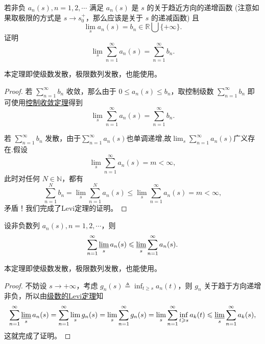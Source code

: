 \documentclass[../../main.tex]{subfiles}
\begin{document}
\begin{theorem}[级数的Levi定理]\label{theorem:级数的Levi定理}
若非负 \( a_n(s), n = 1, 2, \cdots \) 满足 \( a_n(s) \) 是 \( s \) 的关于趋近方向的递增函数 (注意如果取极限的方式是 \( s \to s_0^+ \)，那么应该是关于 \( s \) 的递减函数) 且
\[
\lim_{s} a_n(s) = b_n \in \mathbb{R} \bigcup \{+\infty\}.
\]
证明
\[
\lim_{s} \sum_{n = 1}^{\infty} a_n(s) = \sum_{n = 1}^{\infty} b_n.
\]
\end{theorem}
\begin{note}
本定理即使级数发散，极限数列发散，也能使用。
\end{note}
\begin{proof}
若 \( \sum_{n = 1}^{\infty} b_n \) 收敛，那么由于 \( 0 \leqslant a_n(s) \leqslant b_n \)，取控制级数 \( \sum_{n = 1}^{\infty} b_n \) 即可使用\hyperref[theorem:级数的控制收敛定理]{控制收敛定理}得到
\[
\lim_{s} \sum_{n = 1}^{\infty} a_n(s) = \sum_{n = 1}^{\infty} b_n.
\]

若 \( \sum_{n = 1}^{\infty} b_n \) 发散，由于$\sum_{n = 1}^{\infty} a_n(s)$也单调递增,故$\lim_{s} \sum_{n = 1}^{\infty} a_n(s) $广义存在.假设
\[
\lim_{s} \sum_{n = 1}^{\infty} a_n(s) = m < \infty,
\]
此时对任何 \( N \in \mathbb{N} \)，都有
\[
\sum_{n = 1}^{N} b_n = \lim_{s} \sum_{n = 1}^{N} a_n(s) \leqslant \lim_{s} \sum_{n = 1}^{\infty} a_n(s) = m < \infty,
\]
矛盾！我们完成了Levi定理的证明。
\end{proof}

\begin{lemma}[级数的Fatou引理]\label{lemma:级数的Fatou引理}
设非负数列 \( a_n(s), n = 1, 2, \cdots \)，则
\[
\sum_{n = 1}^{\infty} \varliminf_{s} a_n(s) \leqslant \varliminf_{s} \sum_{n = 1}^{\infty} a_n(s).
\]
\end{lemma}
\begin{note}
本定理即使级数发散，极限数列发散，也能使用。
\end{note}
\begin{proof}
不妨设 \( s \to +\infty \)，考虑 \( g_n(s) \triangleq \inf_{t \geqslant s} a_n(t) \)，则 \( g_n \) 关于趋于方向递增非负，所以由\hyperref[theorem:级数的Levi定理]{级数的Levi定理}知
\[
\sum_{n = 1}^{\infty} \varliminf_{s} a_n(s) = \sum_{n = 1}^{\infty} \lim_{s} g_n(s) = \lim_{s} \sum_{n = 1}^{\infty} g_n(s) = \lim_{s} \sum_{n = 1}^{\infty} \inf_{t \geqslant s} a_k(t) \leqslant \varliminf_{s} \sum_{n = 1}^{\infty} a_k(s),
\]
这就完成了证明。
\end{proof}
\end{document}
